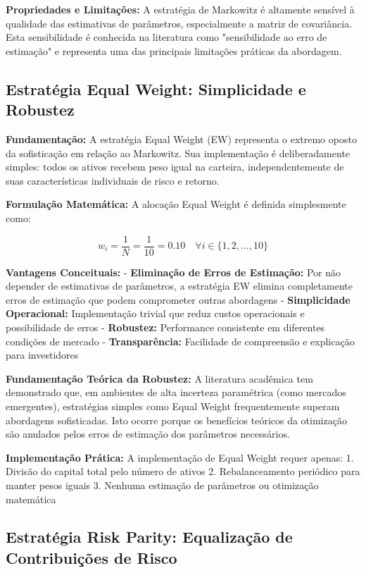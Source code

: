 \textbf{Propriedades e Limitações:} A estratégia de Markowitz é altamente sensível à qualidade das estimativas de parâmetros, especialmente a matriz de covariância. Esta sensibilidade é conhecida na literatura como "sensibilidade ao erro de estimação" e representa uma das principais limitações práticas da abordagem.

\subsection{Estratégia Equal Weight: Simplicidade e Robustez}

\textbf{Fundamentação:} A estratégia Equal Weight (EW) representa o extremo oposto da sofisticação em relação ao Markowitz. Sua implementação é deliberadamente simples: todos os ativos recebem peso igual na carteira, independentemente de suas características individuais de risco e retorno.

\textbf{Formulação Matemática:} A alocação Equal Weight é definida simplesmente como:

\begin{equation}
w_i = \frac{1}{N} = \frac{1}{10} = 0.10 \quad \forall i \in \{1, 2, ..., 10\}
\end{equation}

\textbf{Vantagens Conceituais:}
- \textbf{Eliminação de Erros de Estimação:} Por não depender de estimativas de parâmetros, a estratégia EW elimina completamente erros de estimação que podem comprometer outras abordagens
- \textbf{Simplicidade Operacional:} Implementação trivial que reduz custos operacionais e possibilidade de erros
- \textbf{Robustez:} Performance consistente em diferentes condições de mercado
- \textbf{Transparência:} Facilidade de compreensão e explicação para investidores

\textbf{Fundamentação Teórica da Robustez:} A literatura acadêmica tem demonstrado que, em ambientes de alta incerteza paramétrica (como mercados emergentes), estratégias simples como Equal Weight frequentemente superam abordagens sofisticadas. Isto ocorre porque os benefícios teóricos da otimização são anulados pelos erros de estimação dos parâmetros necessários.

\textbf{Implementação Prática:} A implementação de Equal Weight requer apenas:
1. Divisão do capital total pelo número de ativos
2. Rebalanceamento periódico para manter pesos iguais
3. Nenhuma estimação de parâmetros ou otimização matemática

\subsection{Estratégia Risk Parity: Equalização de Contribuições de Risco}

